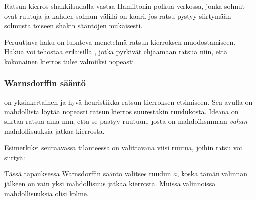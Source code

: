 Ratsun kierros shakkilaudalla vastaa Hamiltonin polkua verkossa,
jonka solmut ovat ruutuja ja kahden solmun välillä on kaari,
jos ratsu pystyy siirtymään solmusta toiseen shakin sääntöjen mukaisesti.

Peruuttava haku on luonteva menetelmä ratsun kierroksen muodostamiseen.
Hakua voi tehostaa erilaisilla ,
jotka pyrkivät ohjaamaan ratsua niin, että kokonainen kierros
tulee valmiiksi nopeasti.

\subsubsection{Warnsdorffin sääntö}


 on yksinkertainen
ja hyvä heuristiikka
ratsun kierroksen etsimiseen.
Sen avulla on mahdollista löytää nopeasti ratsun kierros
suurestakin ruudukosta.
Ideana on siirtää ratsua aina niin,
että se päätyy ruutuun, josta on mahdollisimman \emph{vähän}
mahdollisuuksia jatkaa kierrosta.

Esimerkiksi seuraavassa tilanteessa on valittavana
viisi ruutua, joihin ratsu voi siirtyä:
\begin{center}
\end{center}
Tässä tapauksessa Warnsdorffin sääntö valitsee ruudun $a$,
koska tämän valinnan jälkeen on vain yksi mahdollisuus
jatkaa kierrosta. Muissa valinnoissa mahdollisuuksia olisi kolme.


